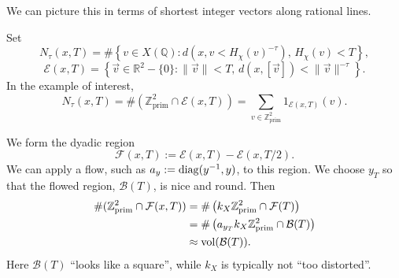 \documentclass[reqno]{amsart} 
\begin{document}
We can picture this in terms of shortest integer vectors along rational lines.

Set
\begin{equation*}
  N_\tau(x, T) = \# \left\{ v \in X(\mathbb{Q}) : d(x, v < H_\chi(v)^{- \tau}), \, H_\chi(v) < T \right\},
\end{equation*}
\begin{equation*}
  \mathcal{E}(x, T) = \left\{ \vec{v} \in \mathbb{R}^2 - \{0\} : \lVert \vec{v} \rVert < T,
    \,
    d(x,[\vec{v}]) < \lVert \vec{v} \rVert^{- \tau}
  \right\}.
\end{equation*}
In the example of interest,
\begin{equation*}
  N_\tau(x, T) = \#(\mathbb{Z}_{\mathrm{prim}}^2 \cap \mathcal{E}(x, T))
  =
  \sum_{v \in \mathbb{Z}^2_{\mathrm{prim}}} 1_{\mathcal{E}(x, T)}(v).
\end{equation*}

We form the dyadic region
\begin{equation*}
  \mathcal{F}(x, T) := \mathcal{E}(x, T) - \mathcal{E}(x, T/2).
\end{equation*}
We can apply a flow, such as $a_y := \operatorname{diag}(y^{-1}, y)$, to this region.  We choose $y_T$ so that the flowed region, $\mathcal{B}(T)$, is nice and round.  Then
\begin{align*}
  \#(\mathbb{Z}^2_{\mathrm{prim}} \cap \mathcal{F}(x, T)) &= \# \left( k_X \mathbb{Z}^2_{\mathrm{prim}} \cap \mathcal{F}(T) \right)
  \\ &=
  \# \left( a_{y_T} k_X \mathbb{Z}^2_{\mathrm{prim}} \cap \mathcal{B}(T) \right) \\
  &\approx \operatorname{vol}(\mathcal{B}(T)).
\end{align*}
Here $\mathcal{B}(T)$ ``looks like a square'', while $k_X$ is typically not ``too distorted''.
\end{document}
